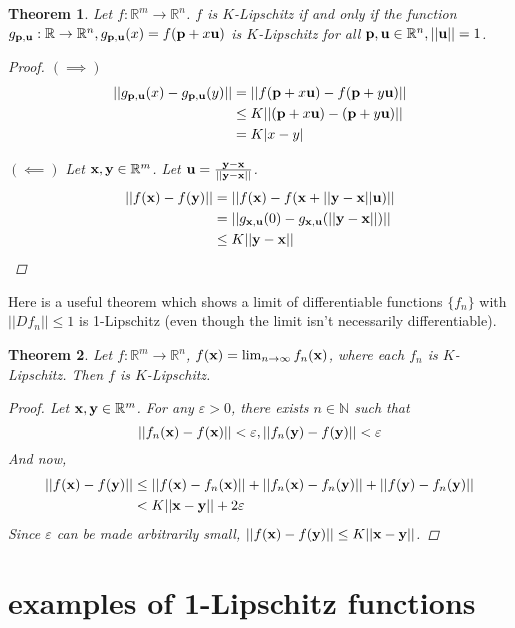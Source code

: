\documentclass{article}
\newcommand\bb\mathbb
\newcommand\ve\varepsilon
\renewcommand\vec\textbf
\newtheorem{theorem}{Theorem}
\begin{document}
\begin{theorem}
\label{dim-reduction}
Let $f:\bb R^m\to\bb R^n$. $f$ is $K$-Lipschitz if and only if
the function $g_{\vec p,\vec u}:\bb R\to\bb R^n,
g_{\vec p,\vec u}(x) = f(\vec p + x \vec u)$ is $K$-Lipschitz for all $\vec p,\vec u\in\bb R^n,||\vec u||=1$.
\begin{proof}
$(\implies)$
\begin{align*}
||g_{\vec p,\vec u}(x) - g_{\vec p,\vec u}(y)|| &= ||f(\vec p + x\vec u) - f(\vec p + y\vec u)||\\
&\leq K||(\vec p + x\vec u) - (\vec p + y\vec u)||\\
&= K|x-y|
\end{align*}

$(\impliedby)$
Let $\vec x,\vec y\in\bb R^m$. Let $\vec u = \frac{\vec y-\vec x}{||\vec y-\vec x||}$.
\begin{align*}
||f(\vec x)-f(\vec y)|| &= ||f(\vec x) - f(\vec x + ||\vec y-\vec x||\vec u)||\\
&= ||g_{\vec x,\vec u}(0) - g_{\vec x,\vec u}(||\vec y-\vec x||)||\\
&\leq K||\vec y-\vec x||
\end{align*}
\end{proof}
\end{theorem}

Here is a useful theorem which shows a limit
of differentiable functions $\{f_n\}$ with $||Df_n|| \leq 1$ is 1-Lipschitz
(even though the limit isn't necessarily differentiable).
\begin{theorem}
\label{limit}
Let $f:\bb R^m\to\bb R^n$, $f(\vec x) = \lim_{n\to\infty} f_n(\vec x)$, where each
$f_n$ is $K$-Lipschitz. Then $f$ is $K$-Lipschitz.
\begin{proof}
Let $\vec x,\vec y\in\bb R^m$. For any $\ve>0$, there exists $n\in\bb N$ such that
$$||f_n(\vec x) - f(\vec x)|| < \ve, ||f_n(\vec y) - f(\vec y)|| < \ve$$
And now,
\begin{align*}
||f(\vec x) - f(\vec y)|| &\leq ||f(\vec x)-f_n(\vec x)|| + ||f_n(\vec x) - f_n(\vec y)|| + ||f(\vec y)-f_n(\vec y)||\\
&< K||\vec x-\vec y|| + 2\ve
\end{align*}
Since $\ve$ can be made arbitrarily small, $||f(\vec x)-f(\vec y)|| \leq K||\vec x-\vec y||$.
\end{proof}
\end{theorem}

\section{examples of 1-Lipschitz functions}
\end{document}
